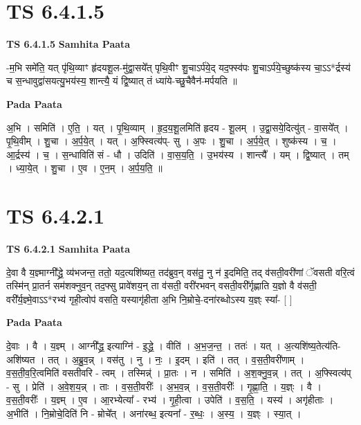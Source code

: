 \documentclass[17pt]{extarticle}
\begin{document}
\section*{ TS 6.4.1.5 }

\textbf{TS 6.4.1.5 } \newline
\textbf{Samhita Paata} \newline

-म॒भि समे॑ति॒ यत् पृ॑थि॒व्याꣳ हृ॑दयशू॒ल-मु॑द्वा॒सये᳚त् पृथि॒वीꣳ शु॒चाऽर्प॑ये॒द् यद॒फ्स्व॑पः शु॒चाऽर्प॑ये॒च्छुष्क॑स्य चा॒ऽऽ*र्द्रस्य॑ च स॒न्धावुद्वा॑सयत्यु॒भय॑स्य॒ शान्त्यै॒ यं द्वि॒ष्यात् तं ध्या॑ये-च्छु॒चैवैन॑-मर्पयति ॥ \newline

\textbf{Pada Paata} \newline

अ॒भि । समिति॑ । ए॒ति॒ । यत् । पृ॒थि॒व्याम् । हृ॒द॒य॒शू॒लमिति॑ हृदय - शू॒लम् । उ॒द्वा॒सये॒दित्यु॑त् - वा॒सये᳚त् । पृ॒थि॒वीम् । शु॒चा । अ॒र्प॒ये॒त् । यत् । अ॒फ्स्वित्य॑प्- सु । अ॒पः । शु॒चा । अ॒र्प॒ये॒त् । शुष्क॑स्य । च॒ । आ॒र्द्रस्य॑ । च॒ । स॒न्धाविति॑ सं - धौ । उदिति॑ । वा॒स॒य॒ति॒ । उ॒भय॑स्य । शान्त्यै᳚ । यम् । द्वि॒ष्यात् । तम् । ध्या॒ये॒त् । शु॒चा । ए॒व । ए॒न॒म् । अ॒र्प॒य॒ति॒ ॥  \newline




\section*{ TS 6.4.2.1 }

\textbf{TS 6.4.2.1 } \newline
\textbf{Samhita Paata} \newline

दे॒वा वै य॒ज्ञ्माग्नी᳚द्ध्रे॒ व्य॑भजन्त॒ ततो॒ यद॒त्यशि॑ष्यत॒ तद॑ब्रुव॒न् वस॑तु॒ नु न॑ इ॒दमिति॒ तद् व॑सती॒वरी॑णां ॅवसती वरि॒त्वं तस्मि॑न् प्रा॒तर्न सम॑शक्नुव॒न् तद॒फ्सु प्रावे॑शय॒न् ता व॑सती॒ वरी॑रभवन् वसती॒वरी᳚र्गृह्णाति य॒ज्ञो वै व॑सती॒ वरी᳚र्य॒ज्ञ्मे॒वाऽऽ*रभ्य॑ गृही॒त्वोप॑ वसति॒ यस्यागृ॑हीता अ॒भि नि॒म्रोचे॒-दना॑रब्धोऽस्य य॒ज्ञ्ः स्या᳚- [  ] \newline

\textbf{Pada Paata} \newline

दे॒वाः । वै । य॒ज्ञ्म् । आग्नी᳚द्ध्र॒ इत्याग्नि॑ - इ॒द्ध्रे॒ । वीति॑ । अ॒भ॒ज॒न्त॒ । ततः॑ । यत् । अ॒त्यशि॑ष्य॒तेत्य॑ति-अशि॑ष्यत । तत् । अ॒ब्रु॒व॒न्न् । वस॑तु । नु । नः॒ । इ॒दम् । इति॑ । तत् । व॒स॒ती॒वरी॑णाम् । व॒स॒ती॒व॒रि॒त्वमिति॑ वसतीवरि - त्वम् । तस्मिन्न्॑ । प्रा॒तः । न । समिति॑ । अ॒श॒क्नु॒व॒न्न् । तत् । अ॒फ्स्वित्य॑प् - सु । प्रेति॑ । अ॒वे॒श॒य॒न्न् । ताः । व॒स॒ती॒वरीः᳚ । अ॒भ॒व॒न्न् । व॒स॒ती॒वरीः᳚ । गृ॒ह्णा॒ति॒ । य॒ज्ञ्ः । वै । व॒स॒ती॒वरीः᳚ । य॒ज्ञ्म् । ए॒व । आ॒रभ्येत्या᳚ - रभ्य॑ । गृ॒ही॒त्वा । उपेति॑ । व॒स॒ति॒ । यस्य॑ । अगृ॑हीताः । अ॒भीति॑ । नि॒म्रोचे॒दिति॑ नि - म्रोचे᳚त् । अना॑रब्ध॒ इत्यना᳚ - र॒ब्धः॒ । अ॒स्य॒ । य॒ज्ञ्ः । स्या॒त् ।  \newline
\end{document}
